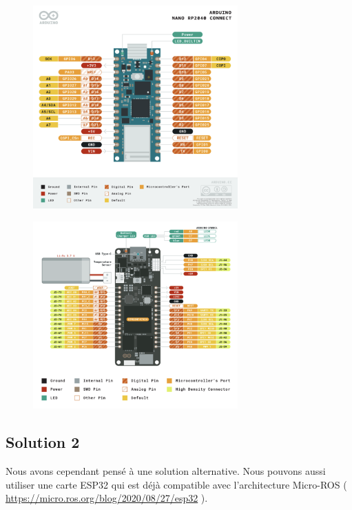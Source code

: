 \begin{figure}[H]
\begin{center}
	\includegraphics[width=0.7\textwidth]{./img/schema_carte_1}
\end{center}
\end{figure}

\begin{figure}[H]
\begin{center}
	\includegraphics[width=0.7\textwidth]{./img/schema_carte_2}
\end{center}
\end{figure}

			\subsection{Solution 2}

Nous avons cependant pensé à une solution alternative. Nous pouvons aussi utiliser une carte ESP32 qui est déjà compatible 
avec l’architecture Micro-ROS ( \url{https://micro.ros.org/blog/2020/08/27/esp32} ).  
\linebreak

